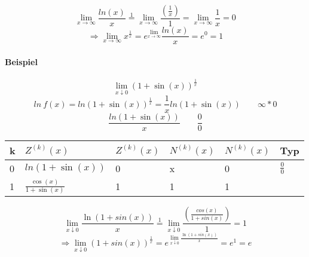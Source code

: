 \documentclass{article}
\begin{document}


\[ \lim_{x \to \infty} \frac{ln(x)}{x} \operatorname*{=}^{1} \lim_{x \to \infty} \frac{\left( \frac{1}{x} \right)}{1} = \lim_{x \to \infty} \frac{1}{x} = 0 \]
\[ \Rightarrow \lim_{x \to \infty} x^{\frac{1}{x}} = e^{\lim_{x \to \infty}} \frac{ln(x)}{x} = e^0 = 1 \]

\paragraph{Beispiel}
\[ \lim_{x \downarrow 0} \left(1 + \sin(x)\right)^{\frac{1}{x}} \]
\[ ln\ f(x) = ln \left(1 + \sin(x)\right)^{\frac{1}{x}} = \frac{1}{x} ln \left(1 + \sin(x)\right) \quad \quad \infty * 0 \]
\[ \frac{ln \left(1 + \sin(x)\right)}{x} \quad \quad \frac{0}{0} \]

\vspace{10 mm}
\begin{tabular}{l l l l l l}
k & $Z^{(k)}(x)$ & $Z^{(k)}(x)$ & $N^{(k)}(x)$ & $N^{(k)}(x)$ & Typ \\
\hline
0 & $ln \left( 1 + \sin(x)\right)$ & 0 & x & 0 & $\frac{0}{0}$ \\
1 & $ \frac{\cos(x)}{1 + \sin(x)}$ & 1 & 1 & 1 \\

\end{tabular}

\vspace{10 mm}
\[ \lim_{x \downarrow 0} \frac{\ln(1 + sin(x))}{x} \operatorname*{=}^{1} \lim_{x \downarrow 0} \frac{\left(\frac{cos(x)}{1+sin(x)}\right) }{1} = 1 \]
\[ \Rightarrow \lim_{x \downarrow 0} \left(1 + sin(x) \right)^{\frac{1}{x}} = e^{\lim_{x \downarrow 0} \frac{\ln(1 + sin(x))}{x}} = e^1 = e \]

\end{document}
